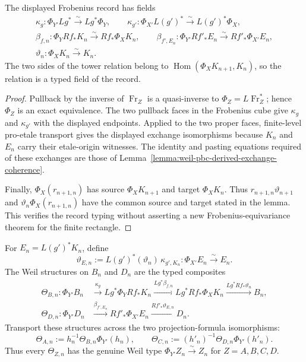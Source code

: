 \begin{lemma}
\label{lemma:weil-sf-well-defined-def-weil-pbc-frobenius-tower-datum}
The displayed Frobenius record has fields
\[
\begin{gathered}
 \kappa_g:\Phi_{Y'}Lg^*\xrightarrow{\sim}Lg^*\Phi_Y,
 \qquad
 \kappa_{g'}:\Phi_{X'}L(g')^*\xrightarrow{\sim}L(g')^*\Phi_X,\\
 \beta_{f,n}:\Phi_YRf_*K_n\xrightarrow{\sim}Rf_*\Phi_XK_n,
 \qquad
 \beta_{f',E_n}:\Phi_{Y'}Rf'_*E_n
       \xrightarrow{\sim}Rf'_*\Phi_{X'}E_n,\\
 \vartheta_n:\Phi_XK_n\xrightarrow{\sim}K_n.
\end{gathered}
\]
The two sides of the tower relation belong to
$\operatorname{Hom}(\Phi_XK_{n+1},K_n)$, so the relation is a typed field of
the record.
\end{lemma}
\begin{proof}
Pullback by the inverse of $\operatorname{Fr}_Z$ is a quasi-inverse to
$\Phi_Z=L\operatorname{Fr}_Z^*$; hence $\Phi_Z$ is an exact equivalence.
The two pullback faces in the Frobenius cube give $\kappa_g$ and
$\kappa_{g'}$ with the displayed endpoints.  Applied to the two proper
faces, finite-level pro-etale transport gives the displayed exchange
isomorphisms because $K_n$ and $E_n$ carry their etale-origin witnesses.
The identity and pasting equations required of these exchanges are those of
Lemma~\ref{lemma:weil-pbc-derived-exchange-coherence}.

Finally, $\Phi_X(r_{n+1,n})$ has source $\Phi_XK_{n+1}$ and target
$\Phi_XK_n$.  Thus
$r_{n+1,n}\vartheta_{n+1}$ and
$\vartheta_n\Phi_X(r_{n+1,n})$ have the common source and target stated in
the lemma.  This verifies the record typing without asserting a new
Frobenius-equivariance theorem for the finite rectangle.
\end{proof}
\begin{definition}
\label{def:weil-pbc-frobenius-corner-structures}
For $E_n=L(g')^*K_n$, define
\[
 \vartheta_{E,n}:=
 L(g')^*(\vartheta_n)\,\kappa_{g',K_n}:
 \Phi_{X'}E_n\xrightarrow{\sim}E_n.
\]
The Weil structures on $B_n$ and $D_n$ are the typed composites
\[
\begin{aligned}
 \Theta_{B,n}:\Phi_{Y'}B_n
 &\xrightarrow{\kappa_g}Lg^*\Phi_YRf_*K_n
 \xrightarrow{Lg^*\beta_{f,n}}Lg^*Rf_*\Phi_XK_n
 \xrightarrow{Lg^*Rf_*\vartheta_n}B_n,\\
 \Theta_{D,n}:\Phi_{Y'}D_n
 &\xrightarrow{\beta_{f',E_n}}Rf'_*\Phi_{X'}E_n
 \xrightarrow{Rf'_*\vartheta_{E,n}}D_n.
\end{aligned}
\]
Transport these structures across the two projection-formula isomorphisms:
\[
 \Theta_{A,n}:=h_n^{-1}\Theta_{B,n}\Phi_{Y'}(h_n),
 \qquad
 \Theta_{C,n}:=(h'_n)^{-1}\Theta_{D,n}\Phi_{Y'}(h'_n).
\]
Thus every $\Theta_{Z,n}$ has the genuine Weil type
$\Phi_{Y'}Z_n\xrightarrow{\sim}Z_n$ for
$Z=A,B,C,D$.
\end{definition}



